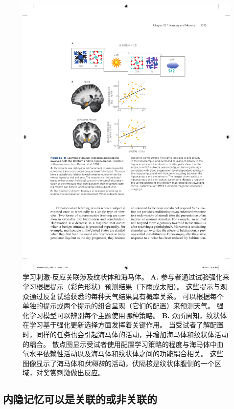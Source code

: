 \begin{figure}[htbp]
	\centering
	\includegraphics[width=0.92\linewidth]{chap52/fig_52_11}
	\caption{学习刺激-反应关联涉及纹状体和海马体\cite{duncan2018more}。
		\textbf{A.} 参与者通过试验强化来学习根据提示（彩色形状）预测结果（下雨或太阳）。
		这些提示与观众通过反复试验获悉的每种天气结果具有概率关系。
		可以根据每个单独的提示或两个提示的组合呈现（它们的配置）来预测天气。
		强化学习模型可以辨别每个主题使用哪种策略。
		\textbf{B.} 众所周知，纹状体在学习基于强化更新选择方面发挥着关键作用。
		当受试者了解配置时，同样的任务也会引起海马体的活动，并增加海马体和纹状体活动的耦合。
		散点图显示受试者使用配置学习策略的程度与海马体中血氧水平依赖性活动以及海马体和纹状体之间的功能耦合相关。
		这些图像显示了海马体和\textit{伏隔核}的活动，伏隔核是纹状体腹侧的一个区域，对奖赏刺激做出反应。}
	\label{fig:52_11}
\end{figure}



\subsection{内隐记忆可以是关联的或非关联的}

